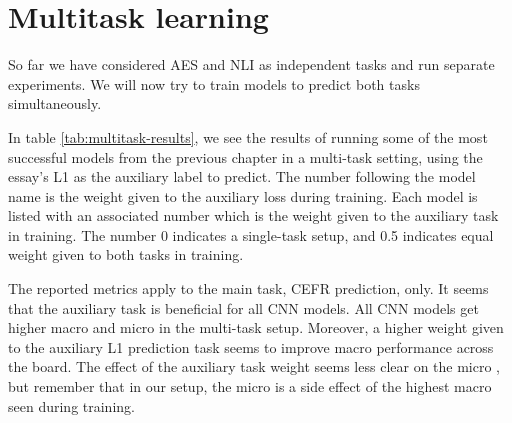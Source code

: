 \chapter{Multitask learning}

So far we have considered \ac{AES} and \ac{NLI} as independent tasks and run
separate experiments. We will now try to train models to predict both tasks
simultaneously.

In table \ref{tab:multitask-results}, we see the results of running some of
the most successful models from the previous chapter in a multi-task setting,
using the essay's L1 as the auxiliary label to predict. The number following
the model name is the weight given to the auxiliary loss during training.
Each model is listed with an associated number which is the weight given to
the auxiliary task in training. The number 0 indicates a single-task setup,
and 0.5 indicates equal weight given to both tasks in training.

The reported metrics apply to the main task, CEFR prediction, only. It seems
that the auxiliary task is beneficial for all CNN models. All CNN models get
higher macro and micro \FI in the multi-task setup. Moreover, a higher weight
given to the auxiliary L1 prediction task seems to improve macro \FI
performance across the board. The effect of the auxiliary task weight seems
less clear on the micro \FI, but remember that in our setup, the micro \FI is
a side effect of the highest macro \FI seen during training.

